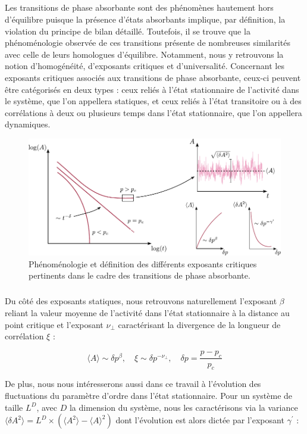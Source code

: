 \label{sec:tphiexp}

\subparagraph{}Les transitions de phase absorbante sont des phénomènes hautement hors d'équilibre puisque la présence d'états absorbants implique, par définition, la violation du principe de bilan détaillé. Toutefois, il se trouve que la phénoménologie observée de ces transitions présente de nombreuses similarités avec celle de leurs homologues d'équilibre. Notamment, nous y retrouvons la notion d'homogénéité, d'exposants critiques et d'universalité. Concernant les exposants critiques associés aux transitions de phase absorbante, ceux-ci peuvent être catégorisés en deux types : ceux reliés à l'état stationnaire de l'activité dans le système, que l'on appellera statiques, et ceux reliés à l'état transitoire ou à des corrélations à deux ou plusieurs temps dans l'état stationnaire, que l'on appellera dynamiques.

\begin{figure}[h]
	\centering
	\includegraphics[width=\textwidth]{Chapitre1/Figures/TphiAbs/expabs.pdf}
	\caption{Phénoménologie et définition des différents exposants critiques pertinents dans le cadre des transitions de phase absorbante.}
	\label{fig:expabs}
\end{figure}

\subparagraph{}Du côté des exposants statiques, nous retrouvons naturellement l'exposant $\beta$ reliant la valeur moyenne de l'activité dans l'état stationnaire à la distance au point critique et l'exposant $\nu_\perp$ caractérisant la divergence de la longueur de corrélation $\xi$ :

\begin{equation}
	\langle A \rangle \sim \delta p^\beta, \quad \xi \sim \delta p^{-\nu_\perp}, \quad \delta p =  \frac{p-p_c}{p_c}
\end{equation}

\noindent De plus, nous nous intéresserons aussi dans ce travail à l'évolution des fluctuations du paramètre d'ordre dans l'état stationnaire. Pour un système de taille $L^D$, avec $D$ la dimension du système, nous les caractérisons via la variance $\langle \delta A^2\rangle  = L^D\times(\langle A ^2 \rangle - \langle A \rangle^2)$ dont l'évolution est alors dictée par l'exposant $\gamma^\prime$ :

